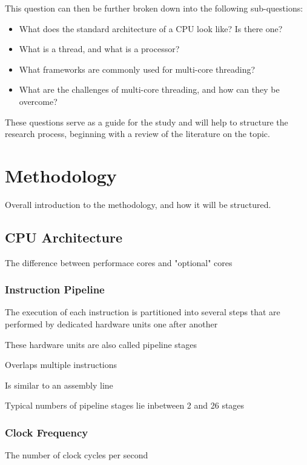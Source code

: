 \documentclass{article}
\begin{document}
This question can then be further broken down into the following sub-questions:

\begin{itemize}
    \item What does the standard architecture of a CPU look like? Is there one?
    \item What is a thread, and what is a processor?
    \item What frameworks are commonly used for multi-core threading?
    \item What are the challenges of multi-core threading, and how can they be overcome?
\end{itemize}

These questions serve as a guide for the study and will help to structure the research process, beginning with a review of the literature on the topic.

\section{Methodology}

Overall introduction to the methodology, and how it will be structured.

\subsection{CPU Architecture}

The difference between performace cores and "optional" cores

\subsubsection{Instruction Pipeline}
The execution of each instruction is partitioned into several steps that are performed by dedicated hardware units one after another


These hardware units are also called pipeline stages

Overlaps multiple instructions

Is similar to an assembly line

Typical numbers of pipeline stages lie inbetween 2 and 26 stages

\subsubsection{Clock Frequency}

The number of clock cycles per second
\end{document}
